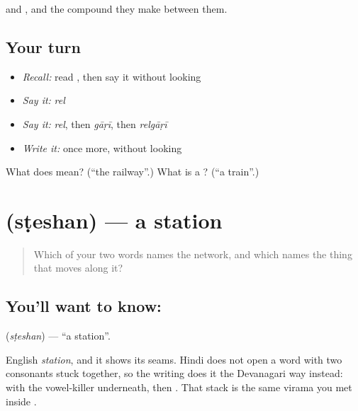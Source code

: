 \begin{grammarlens}[title={What you've built}]
 and , and the compound they make between them.
\end{grammarlens}

\subsection*{Your turn}
\begin{itemize}
\raggedright
  \item \emph{Recall:} read \textbf{}, then say it without looking
  \item \emph{Say it:} \emph{rel}
  \item \emph{Say it:} \emph{rel}, then \emph{gāṛī}, then \emph{relgāṛī}
  \item \emph{Write it:}  once more, without looking
\end{itemize}

\begin{tcolorbox}[breakable,colback=teal!4,colframe=teal!35!black,title={Before you move on}]
What does  mean? (\textquotedblleft{}the railway\textquotedblright{}.) What is a ? (\textquotedblleft{}a train\textquotedblright{}.)
\end{tcolorbox}
\section[sṭeshan]{ (sṭeshan) — a station}

\label{lesson:HI-C69-station}



\begin{quote}
Which of your two words names the network, and which names the thing that moves along it?
\end{quote}

\subsection*{You'll want to know: }
\textbf{} (\emph{sṭeshan}) — \textquotedblleft{}a station\textquotedblright{}.

English \emph{station}, and it shows its seams. Hindi does not open a word with two consonants stuck together, so the writing does it the Devanagari way instead:  with the vowel-killer  underneath, then . That stack is the same virama you met inside .

